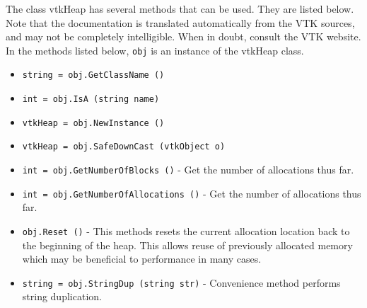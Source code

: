 The class vtkHeap has several methods that can be used.
  They are listed below.
Note that the documentation is translated automatically from the VTK sources,
and may not be completely intelligible.  When in doubt, consult the VTK website.
In the methods listed below, \verb|obj| is an instance of the vtkHeap class.
\begin{itemize}
\item  \verb|string = obj.GetClassName ()|

\item  \verb|int = obj.IsA (string name)|

\item  \verb|vtkHeap = obj.NewInstance ()|

\item  \verb|vtkHeap = obj.SafeDownCast (vtkObject o)|

\item  \verb|int = obj.GetNumberOfBlocks ()| -  Get the number of allocations thus far.

\item  \verb|int = obj.GetNumberOfAllocations ()| -  Get the number of allocations thus far.

\item  \verb|obj.Reset ()| -  This methods resets the current allocation location
 back to the beginning of the heap. This allows
 reuse of previously allocated memory which may be
 beneficial to performance in many cases.

\item  \verb|string = obj.StringDup (string str)| -  Convenience method performs string duplication.

\end{itemize}
